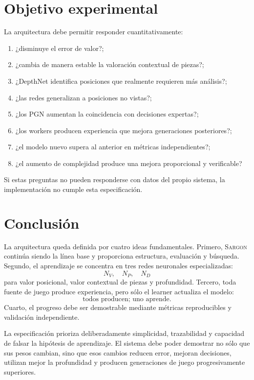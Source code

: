 \documentclass[11pt,a4paper]{article}
\newcommand{\Sargon}{\textsc{Sargon}}
\begin{document}
\section{Objetivo experimental}
La arquitectura debe permitir responder cuantitativamente:
\begin{enumerate}
\item ¿disminuye el error de valor?;
\item ¿cambia de manera estable la valoración contextual de piezas?;
\item ¿DepthNet identifica posiciones que realmente requieren más análisis?;
\item ¿las redes generalizan a posiciones no vistas?;
\item ¿los PGN aumentan la coincidencia con decisiones expertas?;
\item ¿los workers producen experiencia que mejora generaciones posteriores?;
\item ¿el modelo nuevo supera al anterior en métricas independientes?;
\item ¿el aumento de complejidad produce una mejora proporcional y verificable?
\end{enumerate}
Si estas preguntas no pueden responderse con datos del propio sistema, la implementación no cumple esta especificación.

\section{Conclusión}
La arquitectura queda definida por cuatro ideas fundamentales. Primero, \Sargon{} continúa siendo la línea base y proporciona estructura, evaluación y búsqueda. Segundo, el aprendizaje se concentra en tres redes neuronales especializadas:
\[
\boxed{N_V,\quad N_P,\quad N_D}
\]
para valor posicional, valor contextual de piezas y profundidad. Tercero, toda fuente de juego produce experiencia, pero sólo el learner actualiza el modelo:
\[
\boxed{\text{todos producen; uno aprende}}.
\]
Cuarto, el progreso debe ser demostrable mediante métricas reproducibles y validación independiente.

La especificación prioriza deliberadamente simplicidad, trazabilidad y capacidad de falsar la hipótesis de aprendizaje. El sistema debe poder demostrar no sólo que sus pesos cambian, sino que esos cambios reducen error, mejoran decisiones, utilizan mejor la profundidad y producen generaciones de juego progresivamente superiores.
\end{document}
